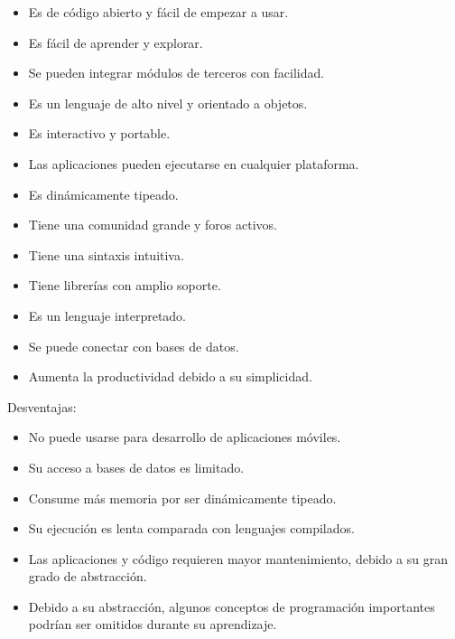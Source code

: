 \documentclass{report}
\begin{document}
\begin{itemize}
  \item Es de código abierto y fácil de empezar a usar.
  
  \item Es fácil de aprender y explorar.
  
  \item Se pueden integrar módulos de terceros con facilidad.
  
  \item Es un lenguaje de alto nivel y orientado a objetos.
  
  \item Es interactivo y portable.
  
  \item Las aplicaciones pueden ejecutarse en cualquier plataforma.
  
  \item Es dinámicamente tipeado.
  
  \item Tiene una comunidad grande y foros activos.
  
  \item Tiene una sintaxis intuitiva.
  
  \item Tiene librerías con amplio soporte.
  
  \item Es un lenguaje interpretado.
  
  \item Se puede conectar con bases de datos.
  
  \item Aumenta la productividad debido a su simplicidad.
  
\end{itemize}

Desventajas:

\begin{itemize}
  \item No puede usarse para desarrollo de aplicaciones móviles.
  
  \item Su acceso a bases de datos es limitado.
  
  \item Consume más memoria por ser dinámicamente tipeado.
  
  \item Su ejecución es lenta comparada con lenguajes compilados.
  
  \item Las aplicaciones y código requieren mayor mantenimiento, debido a su gran grado de abstracción.

  \item Debido a su abstracción, algunos conceptos de programación importantes podrían ser omitidos durante su aprendizaje.

\end{itemize}
\end{document}
